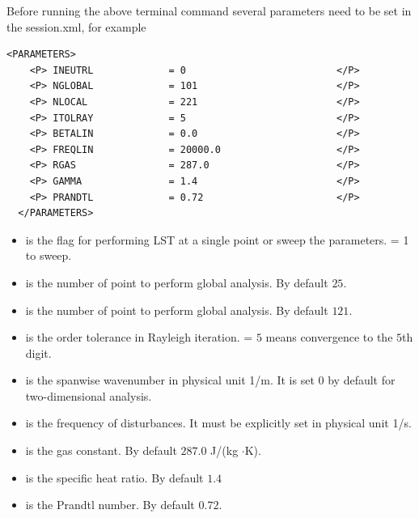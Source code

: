 Before running the above terminal command several parameters need to be set in
the session.xml, for example
\begin{lstlisting}[style=XmlStyle]
  <PARAMETERS>
    <P> INEUTRL             = 0                          </P>
    <P> NGLOBAL             = 101                        </P>
    <P> NLOCAL              = 221                        </P>
    <P> ITOLRAY             = 5                          </P>
    <P> BETALIN             = 0.0                        </P>
    <P> FREQLIN             = 20000.0                    </P>
    <P> RGAS                = 287.0                      </P>
    <P> GAMMA               = 1.4                        </P>
    <P> PRANDTL             = 0.72                       </P>
  </PARAMETERS>
  \end{lstlisting}
  \begin{itemize}
  \item {} is the flag for performing LST at a single point or sweep the parameters. 
         = 1 to sweep.
  \item {} is the number of point to perform global analysis. By default $25$.
  \item {} is the number of point to perform global analysis. By default $121$.
  \item {} is the order tolerance in Rayleigh iteration.  = $5$ means convergence to the $5$th digit.
  \item {} is the spanwise wavenumber in physical unit 1/m. It is set $0$ by default for two-dimensional analysis.
  \item {} is the frequency of disturbances. It must be explicitly set in physical unit 1/s.
  \item {} is the gas constant. By default $287.0$ J/(kg $\cdot$K).
  \item {} is the specific heat ratio. By default $1.4$
  \item {} is the Prandtl number. By default $0.72$.
  \end{itemize}

